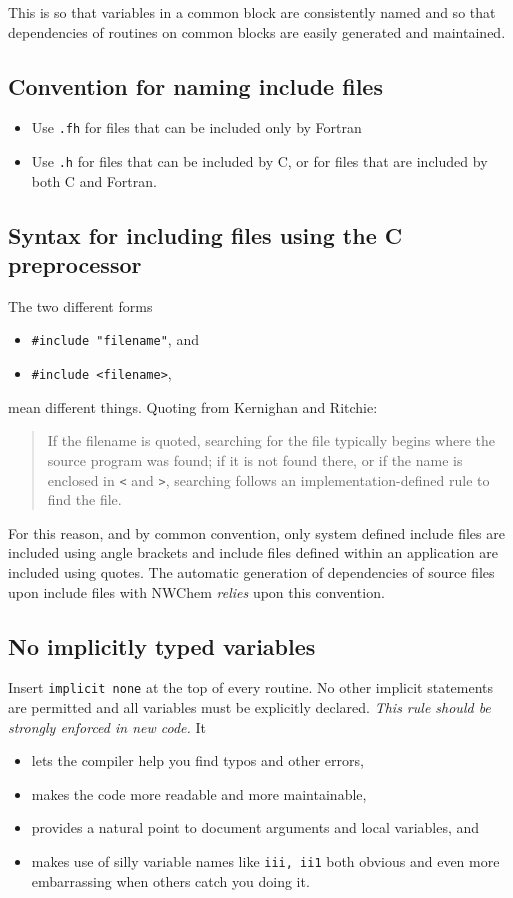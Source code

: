 This is so that variables in a common block are consistently named and
so that dependencies of routines on common blocks are easily generated
and maintained.

\subsection{Convention for naming include files}

\begin{itemize}
\item Use \verb+.fh+ for files that can be included only by Fortran
\item Use \verb+.h+ for files that can be included by C, or
  for files that are included by both C and Fortran.
\end{itemize}

\subsection{Syntax for including files using the C preprocessor}

The two different forms
\begin{itemize}
\item \verb+#include "filename"+, and
\item \verb+#include <filename>+,
\end{itemize}
mean different things.  Quoting from Kernighan and Ritchie:
\begin{quotation}
 If the {\em} filename is quoted, searching for the file typically
 begins where the source program was found; if it is not found there,
 or if the name is enclosed in \verb+<+ and \verb+>+, searching follows
 an implementation-defined rule to find the file.
\end{quotation}
For this reason, and by common convention, only system defined include
files are included using angle brackets and include files defined
within an application are included using quotes.  The
automatic generation of dependencies of source files upon include
files with NWChem {\em relies} upon this convention.


\subsection{No implicitly typed variables}

Insert {\tt implicit none} at the top of every routine.  No other
implicit statements are permitted and all variables must be explicitly
declared.  {\em This rule should be strongly enforced in new code.} It
\begin{itemize}
\item lets the compiler help you find typos and other errors,
\item makes the code more readable and more maintainable,
\item provides a natural point to document arguments and local
  variables, and
\item makes use of silly variable names like {\tt iii, ii1} both
  obvious and even more embarrassing when others catch you doing it.
\end{itemize}

